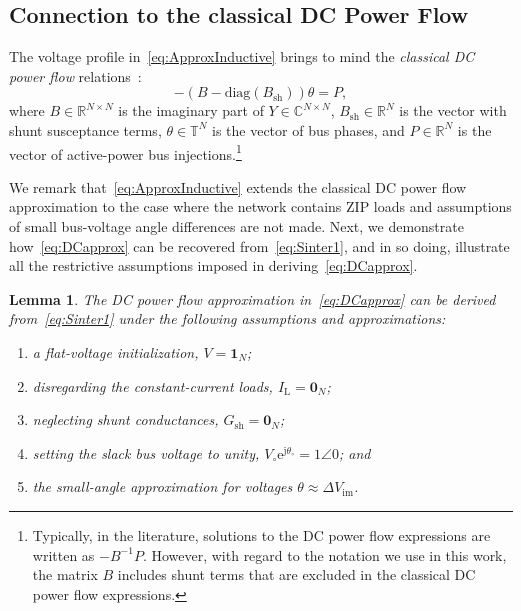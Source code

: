 \documentclass[10 pt, conference]{ieeeconf}
\newtheorem{lemma}{Lemma}
\begin{document}
\subsection{Connection to the classical DC Power Flow} \label{sec:DCPowerFlow} 
The voltage profile in~\eqref{eq:ApproxInductive} brings to mind the \emph{classical DC power flow} relations~\cite{Wood:1996}:
\begin{equation} \label{eq:DCapprox}
-\left(B - \mathrm{diag}(B_\mathrm{sh}) \right) \theta = P,
\end{equation}
where $B \in \mathbb{R}^{N\times N}$ is the imaginary part of $Y \in \mathbb{C}^{N\times N}$, $B_\mathrm{sh} \in \mathbb{R}^N$ is the vector with shunt susceptance terms, $\theta \in \mathbb{T}^N$ is the vector of bus phases, and $P \in \mathbb{R}^N$ is the vector of active-power bus injections.\footnote{Typically, in the literature, solutions to the DC power flow expressions are written as $-B^{-1}P$. However, with regard to the notation we use in this work, the matrix $B$ includes shunt terms that are excluded in the classical DC power flow expressions.}

We remark that~\eqref{eq:ApproxInductive} extends the classical DC power flow approximation to the case where the network contains $\mathrm{ZIP}$ loads and assumptions of small bus-voltage angle differences are not made. Next, we demonstrate how~\eqref{eq:DCapprox} can be recovered from~\eqref{eq:Sinter1}, and in so doing, illustrate all the restrictive assumptions imposed in deriving~\eqref{eq:DCapprox}. 


\begin{lemma}
The DC power flow approximation in~\eqref{eq:DCapprox} can be derived from~\eqref{eq:Sinter1} under the following assumptions and approximations:
\begin{enumerate}
\item a flat-voltage initialization, $V = \mathbf{1}_N$; 
\item disregarding the constant-current loads, $I_\mathrm{L} = \mathbf{0}_N$;  
\item neglecting shunt conductances, $G_\mathrm{sh} = \mathbf{0}_N$; 
\item setting the slack bus voltage to unity, $V_\circ \mathrm{e}^{\mathrm j \theta_\circ} = 1 \angle 0$; and 
\item the small-angle approximation for voltages $\theta \approx \Delta V_\mathrm {im}$.
\end{enumerate}
\end{lemma}
\end{document}
